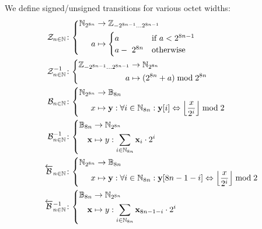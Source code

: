 We define signed/unsigned transitions for various octet widths:
\begin{align}
  \label{eq:signedfunc}
  \signfunc{n \in \N}&\colon\left\{\begin{aligned}
    \N_{2^{8n}} &\to \Z_{-2^{8n-1}\dots2^{8n-1}}\\
    a &\mapsto \begin{cases}
      a &\when a < 2^{8n-1} \\
      a -\ 2^{8n} &\otherwise
    \end{cases}
  \end{aligned}\right.\\
  \unsignfunc{n \in \N}&\colon\left\{\begin{aligned}
    \Z_{-2^{8n-1}\dots2^{8n-1}} &\to \N_{2^{8n}}\\
    a &\mapsto (2^{8n} + a) \bmod 2^{8n}
  \end{aligned}\right.\\
  \label{eq:bitsfunc}
  \bitsfunc{n\in\N}&\colon\left\{\begin{aligned}
    \N_{2^{8n}} &\to \mathbb{B}_{8n}\\
    x &\mapsto \mathbf{y}: \forall i \in \N_{8n} : \mathbf{y}[i] \Leftrightarrow \ffrac{x}{2^i}\bmod 2
  \end{aligned}\right.\\
  \unbitsfunc{n\in\N}&\colon\left\{\begin{aligned}
    \mathbb{B}_{8n} &\to \N_{2^{8n}}\\
    \mathbf{x} &\mapsto y: \sum_{i \in \N_{8n}} \mathbf{x}_i \cdot 2^i
  \end{aligned}\right.\\
  \label{eq:revbitsfunc}
  \revbitsfunc{n\in\N}&\colon\left\{\begin{aligned}
    \N_{2^{8n}} &\to \mathbb{B}_{8n}\\
    x &\mapsto \mathbf{y}: \forall i \in \N_{8n} : \mathbf{y}[8n - 1 - i] \Leftrightarrow \ffrac{x}{2^i}\bmod 2
  \end{aligned}\right.\\
  \revunbitsfunc{n\in\N}&\colon\left\{\begin{aligned}
    \mathbb{B}_{8n} &\to \N_{2^{8n}}\\
    \mathbf{x} &\mapsto y: \sum_{i \in \N_{8n}} \mathbf{x}_{8n - 1 - i} \cdot 2^i
  \end{aligned}\right.
\end{align}

\newcommand{\sext}{\mathcal{X}}


